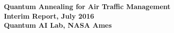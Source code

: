 \documentclass[9pt]{extarticle}
\begin{document}
\begin{center}\Large
\textbf{Quantum Annealing for Air Traffic Management\\Interim Report, July 2016\\Quantum AI Lab, NASA Ames}
\end{center}

\begin{multicols}{2}





\end{multicols}




\end{document}
